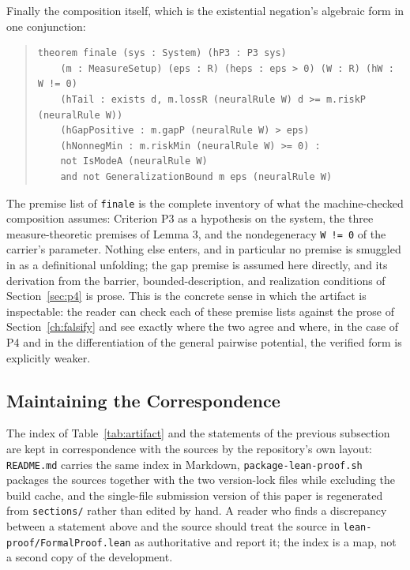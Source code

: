 Finally the composition itself, which is the existential negation's algebraic form in one conjunction:

\begin{quote}
\small
\begin{verbatim}
theorem finale (sys : System) (hP3 : P3 sys)
    (m : MeasureSetup) (eps : R) (heps : eps > 0) (W : R) (hW : W != 0)
    (hTail : exists d, m.lossR (neuralRule W) d >= m.riskP (neuralRule W))
    (hGapPositive : m.gapP (neuralRule W) > eps)
    (hNonnegMin : m.riskMin (neuralRule W) >= 0) :
    not IsModeA (neuralRule W)
    and not GeneralizationBound m eps (neuralRule W)
\end{verbatim}
\end{quote}

The premise list of \texttt{finale} is the complete inventory of what the machine-checked composition assumes: Criterion P3 as a hypothesis on the system, the three measure-theoretic premises of Lemma 3, and the nondegeneracy \texttt{W != 0} of the carrier's parameter. Nothing else enters, and in particular no premise is smuggled in as a definitional unfolding; the gap premise is assumed here directly, and its derivation from the barrier, bounded-description, and realization conditions of Section~\ref{sec:p4} is prose. This is the concrete sense in which the artifact is inspectable: the reader can check each of these premise lists against the prose of Section~\ref{ch:falsify} and see exactly where the two agree and where, in the case of P4 and in the differentiation of the general pairwise potential, the verified form is explicitly weaker.

\subsection{Maintaining the Correspondence}

The index of Table~\ref{tab:artifact} and the statements of the previous subsection are kept in correspondence with the sources by the repository's own layout: \texttt{README.md} carries the same index in Markdown, \texttt{package-lean-proof.sh} packages the sources together with the two version-lock files while excluding the build cache, and the single-file submission version of this paper is regenerated from \texttt{sections/} rather than edited by hand. A reader who finds a discrepancy between a statement above and the source should treat the source in \texttt{lean-proof/FormalProof.lean} as authoritative and report it; the index is a map, not a second copy of the development.
